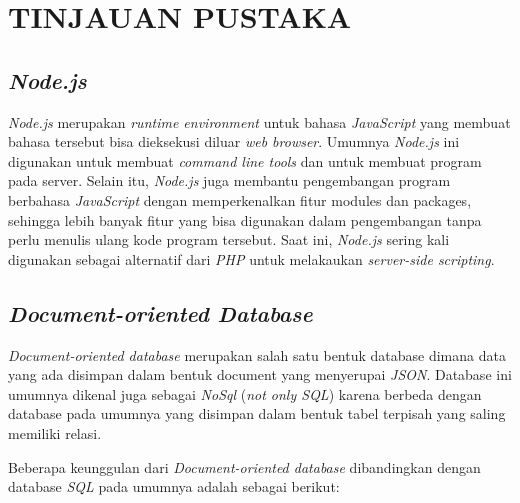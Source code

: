 \chapter{TINJAUAN PUSTAKA}
\vspace{4ex}

\setlength{\parindent}{7ex}


\section{\emph{Node.js}}
\vspace{1ex}

\emph{Node.js} merupakan \emph{runtime environment} untuk bahasa \emph{JavaScript} yang membuat bahasa tersebut bisa dieksekusi diluar \emph{web browser}.
Umumnya \emph{Node.js} ini digunakan untuk membuat \emph{command line tools} dan untuk membuat program pada server.
Selain itu, \emph{Node.js} juga membantu pengembangan program berbahasa \emph{JavaScript} dengan memperkenalkan fitur modules dan packages, sehingga lebih banyak fitur yang bisa digunakan dalam pengembangan tanpa perlu menulis ulang kode program tersebut.
Saat ini, \emph{Node.js} sering kali digunakan sebagai alternatif dari \emph{PHP} untuk melakaukan \emph{server-side scripting}.
\vspace{0.5ex}

\section{\emph{Document-oriented Database}}
\vspace{1ex}

\emph{Document-oriented database} merupakan salah satu bentuk database dimana data yang ada disimpan dalam bentuk document yang menyerupai \emph{JSON}.
Database ini umumnya dikenal juga sebagai \emph{NoSql} (\emph{not only SQL}) karena berbeda dengan database pada umumnya yang disimpan dalam bentuk tabel terpisah yang saling memiliki relasi.
\vspace{0.5ex}

Beberapa keunggulan dari \emph{Document-oriented database} dibandingkan dengan database \emph{SQL} pada umumnya adalah sebagai berikut:
\vspace{0.5ex}

